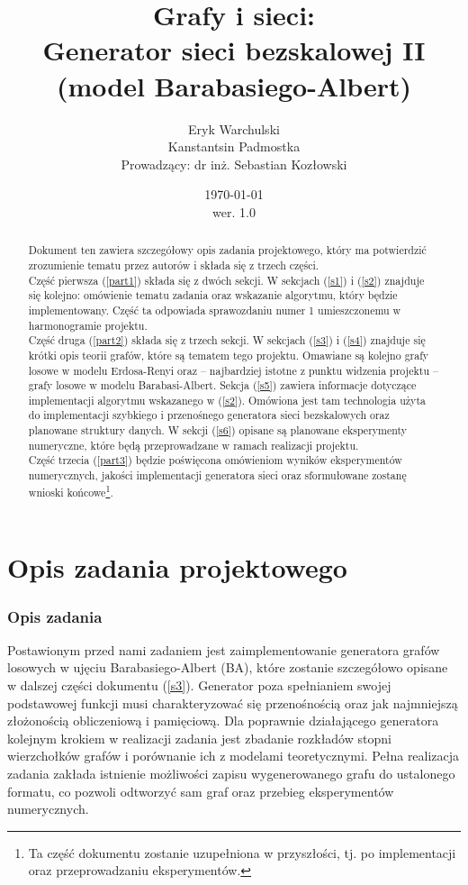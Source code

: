 \documentclass{article}
\title{Grafy i sieci: \\ Generator sieci bezskalowej II (model Barabasiego-Albert)}
\author{Eryk Warchulski \\ Kanstantsin Padmostka \\ Prowadzący: dr inż. Sebastian Kozłowski}%
\date{\today\\wer. 1.0}
\def\lecturemark{}
\newcommand{\spr}[1]{\part{#1}\def\lecturemark{\partname\ \thepart: #1}}
\renewcommand{\partname}{Sprawozdanie}
\renewcommand{\thepart}{\arabic{part}}
\begin{document}
\maketitle
{\footnotesize{\tableofcontents}}
\newpage
{}
\vspace*{\fill}
\begin{abstract}
	Dokument ten zawiera szczegółowy opis zadania projektowego, który ma potwierdzić zrozumienie tematu przez autorów i składa się z trzech części.\\
	Część pierwsza (\ref{part1}) składa się z dwóch sekcji. W sekcjach (\ref{s1}) i (\ref{s2}) znajduje się kolejno: omówienie tematu zadania oraz wskazanie algorytmu, który będzie implementowany. Część ta odpowiada sprawozdaniu numer 1 umieszczonemu w harmonogramie projektu. \\ 
	Część druga (\ref{part2}) składa się z trzech sekcji. W sekcjach (\ref{s3}) i (\ref{s4}) znajduje się krótki opis teorii grafów, które są
	tematem tego projektu. Omawiane są kolejno grafy losowe w modelu Erdosa-Renyi oraz -- najbardziej istotne z punktu widzenia projektu -- 
	grafy losowe w modelu Barabasi-Albert.
	Sekcja (\ref{s5}) zawiera informacje dotyczące implementacji algorytmu wskazanego w (\ref{s2}). Omówiona jest tam technologia użyta do implementacji
	szybkiego i przenośnego generatora sieci bezskalowych oraz planowane struktury danych. W sekcji (\ref{s6}) opisane są planowane eksperymenty
	numeryczne, które będą przeprowadzane w ramach realizacji projektu. \\
	Część trzecia (\ref{part3}) będzie poświęcona omówieniom wyników eksperymentów numerycznych, jakości implementacji generatora sieci oraz sformułowane zostanę wnioski końcowe\footnote{Ta część dokumentu zostanie uzupełniona w przyszłości, tj. po implementacji oraz przeprowadzaniu eksperymentów.}. 
\end{abstract}
\vspace*{\fill}
\newpage
\spr{Opis zadania projektowego \label{part1}}
\section{Opis zadania \label{s1}}
	Postawionym przed nami zadaniem jest zaimplementowanie generatora grafów losowych w ujęciu Barabasiego-Albert (BA), które zostanie szczegółowo
	opisane w dalszej części dokumentu (\ref{s3}). Generator poza spełnianiem swojej podstawowej funkcji musi charakteryzować się
	przenośnością oraz jak najmniejszą złożonością obliczeniową i pamięciową. Dla poprawnie działającego generatora kolejnym krokiem w realizacji
	zadania jest zbadanie rozkładów stopni wierzchołków grafów i porównanie ich z modelami teoretycznymi. Pełna realizacja zadania zakłada istnienie
	możliwości zapisu wygenerowanego grafu do ustalonego formatu, co pozwoli odtworzyć sam graf oraz przebieg eksperymentów numerycznych.\\
\end{document}

